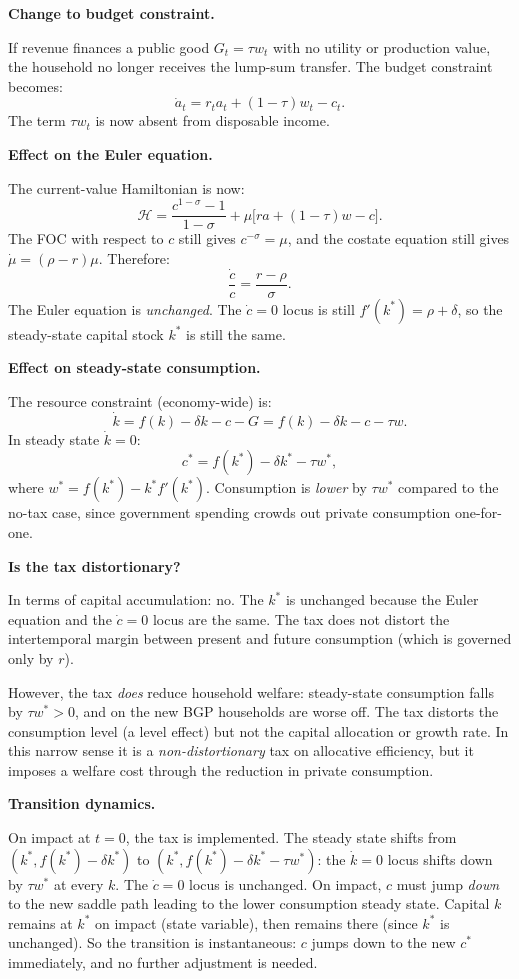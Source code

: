 \documentclass[a4paper,11pt]{article}
\begin{document}
\begin{answerbox}
\textbf{Change to budget constraint.}

If revenue finances a public good $G_t = \tau w_t$ with no utility or production value,
the household no longer receives the lump-sum transfer. The budget constraint becomes:
\[
    \dot{a}_t = r_t a_t + (1-\tau)w_t - c_t.
\]
The term $\tau w_t$ is now absent from disposable income.

\textbf{Effect on the Euler equation.}

The current-value Hamiltonian is now:
\[
    \mathcal{H} = \frac{c^{1-\sigma}-1}{1-\sigma} + \mu\bigl[r a + (1-\tau)w - c\bigr].
\]
The FOC with respect to $c$ still gives $c^{-\sigma} = \mu$, and the costate equation
still gives $\dot{\mu} = (\rho - r)\mu$. Therefore:
\[
    \frac{\dot{c}}{c} = \frac{r - \rho}{\sigma}.
\]
The Euler equation is \emph{unchanged}. The $\dot{c} = 0$ locus is still $f'(k^*) = \rho + \delta$,
so the steady-state capital stock $k^*$ is still the same.

\textbf{Effect on steady-state consumption.}

The resource constraint (economy-wide) is:
\[
    \dot{k} = f(k) - \delta k - c - G = f(k) - \delta k - c - \tau w.
\]
In steady state $\dot{k} = 0$:
\[
    c^* = f(k^*) - \delta k^* - \tau w^*,
\]
where $w^* = f(k^*) - k^* f'(k^*)$. Consumption is \emph{lower} by $\tau w^*$ compared
to the no-tax case, since government spending crowds out private consumption
one-for-one.

\textbf{Is the tax distortionary?}

In terms of capital accumulation: no. The $k^*$ is unchanged because the Euler equation
and the $\dot{c}=0$ locus are the same. The tax does not distort the intertemporal
margin between present and future consumption (which is governed only by $r$).

However, the tax \emph{does} reduce household welfare: steady-state consumption falls by
$\tau w^* > 0$, and on the new BGP households are worse off. The tax distorts the
consumption level (a level effect) but not the capital allocation or growth rate. In this
narrow sense it is a \emph{non-distortionary} tax on allocative efficiency, but it
imposes a welfare cost through the reduction in private consumption.

\textbf{Transition dynamics.}

On impact at $t=0$, the tax is implemented. The steady state shifts from
$(k^*, f(k^*)-\delta k^*)$ to $(k^*, f(k^*)-\delta k^* - \tau w^*)$: the $\dot{k}=0$
locus shifts down by $\tau w^*$ at every $k$. The $\dot{c}=0$ locus is unchanged.
On impact, $c$ must jump \emph{down} to the new saddle path leading to the lower
consumption steady state. Capital $k$ remains at $k^*$ on impact (state variable), then
remains there (since $k^*$ is unchanged). So the transition is instantaneous: $c$ jumps
down to the new $c^*$ immediately, and no further adjustment is needed.
\end{answerbox}
\end{document}

